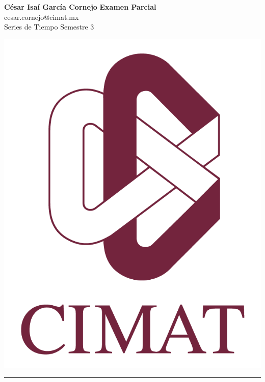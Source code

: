 \documentclass[a4paper, 11pt]{article}
\begin{document}
	\noindent
	
	\begin{minipage}[b][1.2cm][t]{0.8\textwidth}
		\large\textbf{César Isaí García Cornejo} \hfill \textbf{Examen Parcial}  \\
		cesar.cornejo@cimat.mx \hfill \\
		\normalsize Series de Tiempo \hfill Semestre 3\\
	\end{minipage}
	
	\hspace{14.4cm}
	\begin{minipage}[b][0.03cm][t]{0.12\linewidth}
		
		\vspace{-2.2cm}
		\includegraphics[scale=0.3]{Figures/EscudoCimat.png}
	\end{minipage}
	
	\noindent\rule{7in}{2.8pt}
	
\end{document}
